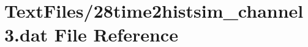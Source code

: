 \hypertarget{28time2histsim__channel3_8dat}{}\section{Text\+Files/28time2histsim\+\_\+channel3.dat File Reference}
\label{28time2histsim__channel3_8dat}
